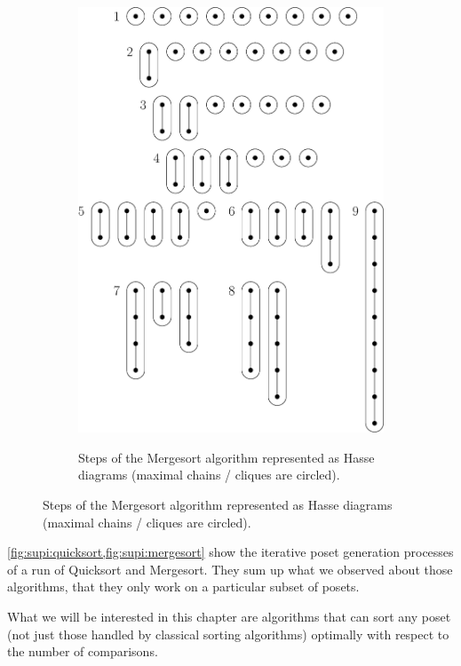 \begin{figure}
\begin{subfigure}[b]{0.4\textwidth}
{\includegraphics[width=\textwidth]{fig/supi/mergesort}} \caption{Steps of the
Mergesort algorithm represented as Hasse diagrams (maximal chains / cliques are
circled).} \label{fig:supi:mergesort} \end{subfigure} \end{figure}


\cref{fig:supi:quicksort,fig:supi:mergesort} show the iterative poset
generation processes of a run of Quicksort and Mergesort. They sum up what we
observed about those algorithms, that they only work on a particular subset of
posets.

What we will be interested in this chapter are algorithms that can sort any
poset (not just those handled by classical sorting algorithms) optimally with
respect to the number of comparisons.
